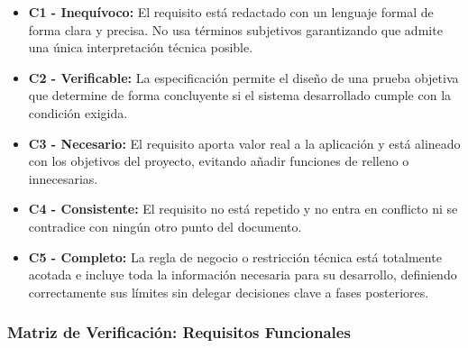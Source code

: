 \begin{itemize}
    \item \textbf{C1 - Inequívoco:} El requisito está redactado con un lenguaje formal de forma clara y precisa. No usa términos subjetivos garantizando que admite una única interpretación técnica posible.
    \item \textbf{C2 - Verificable:} La especificación permite el diseño de una prueba objetiva que determine de forma concluyente si el sistema desarrollado cumple con la condición exigida.
    \item \textbf{C3 - Necesario:} El requisito aporta valor real a la aplicación y está alineado con los objetivos del proyecto, evitando añadir funciones de relleno o innecesarias.
    \item \textbf{C4 - Consistente:} El requisito no está repetido y no entra en conflicto ni se contradice con ningún otro punto del documento.
    \item \textbf{C5 - Completo:} La regla de negocio o restricción técnica está totalmente acotada e incluye toda la información necesaria para su desarrollo, definiendo correctamente sus límites sin delegar decisiones clave a fases posteriores.
\end{itemize}

\newcommand{\pass}{\cmark} %
\newcommand{\fail}{\xmark} %
\newcommand{\warn}{\textcolor{orange}{\textbf{!}}} %

\subsubsection{Matriz de Verificación: Requisitos Funcionales}

